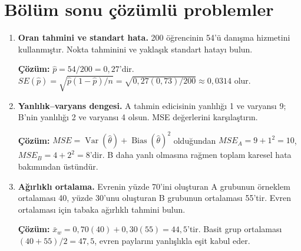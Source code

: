 \section{Bölüm sonu çözümlü problemler}

\begin{enumerate}
  \item \textbf{Oran tahmini ve standart hata.} 200 öğrencinin 54'ü danışma hizmetini kullanmıştır. Nokta tahminini ve yaklaşık standart hatayı bulun.

  \textbf{Çözüm:} $\hat p=54/200=0{,}27$'dir. $SE(\hat p)=\sqrt{\hat p(1-\hat p)/n}=\sqrt{0{,}27(0{,}73)/200}\approx0{,}0314$ olur.

  \item \textbf{Yanlılık--varyans dengesi.} A tahmin edicisinin yanlılığı 1 ve varyansı 9; B'nin yanlılığı 2 ve varyansı 4 olsun. MSE değerlerini karşılaştırın.

  \textbf{Çözüm:} $MSE=\operatorname{Var}(\hat\theta)+\operatorname{Bias}(\hat\theta)^2$ olduğundan $MSE_A=9+1^2=10$, $MSE_B=4+2^2=8$'dir. B daha yanlı olmasına rağmen toplam karesel hata bakımından üstündür.

  \item \textbf{Ağırlıklı ortalama.} Evrenin yüzde 70'ini oluşturan A grubunun örneklem ortalaması 40, yüzde 30'unu oluşturan B grubunun ortalaması 55'tir. Evren ortalaması için tabaka ağırlıklı tahmini bulun.

  \textbf{Çözüm:} $\bar x_w=0{,}70(40)+0{,}30(55)=44{,}5$'tir. Basit grup ortalaması $(40+55)/2=47{,}5$, evren paylarını yanlışlıkla eşit kabul eder.
\end{enumerate}